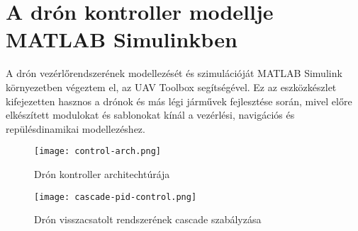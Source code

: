 \section{A drón kontroller modellje MATLAB Simulinkben}
A drón vezérlőrendszerének modellezését és szimulációját MATLAB Simulink környezetben végeztem el, az UAV Toolbox segítségével. Ez az eszközkészlet kifejezetten hasznos a drónok és más légi járművek fejlesztése során, mivel előre elkészített modulokat és sablonokat kínál a vezérlési, navigációs és repülésdinamikai modellezéshez.

\begin{figure}[H]
	\centering
	\texttt{[image: control-arch.png]}
	\caption{Drón kontroller architechtúrája}
	\label{Drón kontroller architechtúrája SIMULINK környezetben}
\end{figure}

\begin{figure}[H]
	\centering
	\texttt{[image: cascade-pid-control.png]}
	\caption{Drón visszacsatolt rendszerének cascade szabályzása}
	\label{Drón visszacsatolt rendszerének cascade szabályzása}
\end{figure}
